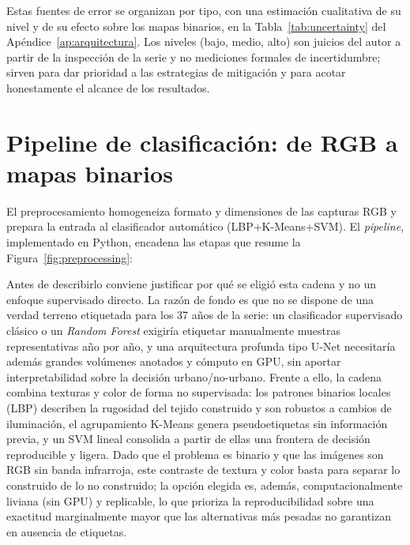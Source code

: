Estas fuentes de error se organizan por tipo, con una estimación cualitativa de su nivel y de su efecto sobre los mapas binarios, en la Tabla~\ref{tab:uncertainty} del Apéndice~\ref{ap:arquitectura}. Los niveles (bajo, medio, alto) son juicios del autor a partir de la inspección de la serie y no mediciones formales de incertidumbre; sirven para dar prioridad a las estrategias de mitigación y para acotar honestamente el alcance de los resultados.

\section{Pipeline de clasificación: de RGB a mapas binarios}

El preprocesamiento homogeneiza formato y dimensiones de las capturas RGB y prepara la entrada al clasificador automático (LBP+K-Means+SVM). El \textit{pipeline}, implementado en Python, encadena las etapas que resume la Figura~\ref{fig:preprocessing}:

Antes de describirlo conviene justificar por qué se eligió esta cadena y no un enfoque supervisado directo. La razón de fondo es que no se dispone de una verdad terreno etiquetada para los 37 años de la serie: un clasificador supervisado clásico o un \textit{Random Forest} exigiría etiquetar manualmente muestras representativas año por año, y una arquitectura profunda tipo U-Net necesitaría además grandes volúmenes anotados y cómputo en GPU, sin aportar interpretabilidad sobre la decisión urbano/no-urbano. Frente a ello, la cadena combina texturas y color de forma no supervisada: los patrones binarios locales (LBP) describen la rugosidad del tejido construido y son robustos a cambios de iluminación, el agrupamiento K-Means genera pseudoetiquetas sin información previa, y un SVM lineal consolida a partir de ellas una frontera de decisión reproducible y ligera. Dado que el problema es binario y que las imágenes son RGB sin banda infrarroja, este contraste de textura y color basta para separar lo construido de lo no construido; la opción elegida es, además, computacionalmente liviana (sin GPU) y replicable, lo que prioriza la reproducibilidad sobre una exactitud marginalmente mayor que las alternativas más pesadas no garantizan en ausencia de etiquetas.

